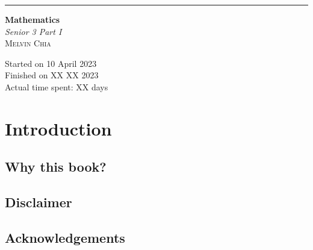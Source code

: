 \documentclass[12pt]{report}
\begin{document}
\newcommand{\sol}[1]{

    \noindent \textbf{Sol.}
}
\newcommand{\prooff}[1]{

    \noindent \textbf{Proof.}
}

\newcommand{\sxrightarrow}[2][]{%
    \mathrel{\text{$\xrightarrow[#1]{#2}$}}%
}

\newenvironment{cequation}{
    \makeatletter
    \setbool{@fleqn}{false}
    \makeatother
    \begin{equation*}
        }{\end{equation*}}

\begin{titlepage}
    \raggedleft{}
    \rule{1pt}{\textheight}
    \hspace{0.02\textwidth}
    \parbox[b]{0.75\textwidth}{

    {\fontsize{40}{60}\selectfont\bfseries Mathematics}\\[2\baselineskip]
    {\huge\textit{Senior 3 Part I}}\\[4\baselineskip]
    {\Large\textsc{Melvin Chia}}

    \vspace{0.5\textheight}

    {\noindent Started on 10 April 2023}\\[\baselineskip]
    {\noindent Finished on XX XX 2023}\\[\baselineskip]
    {\noindent Actual time spent: XX days}\\[\baselineskip]}

\end{titlepage}

\chapter*{Introduction}
 

\doublespacing{}
\section*{Why this book?}

\section*{Disclaimer}
\section*{Acknowledgements}
\end{document}
